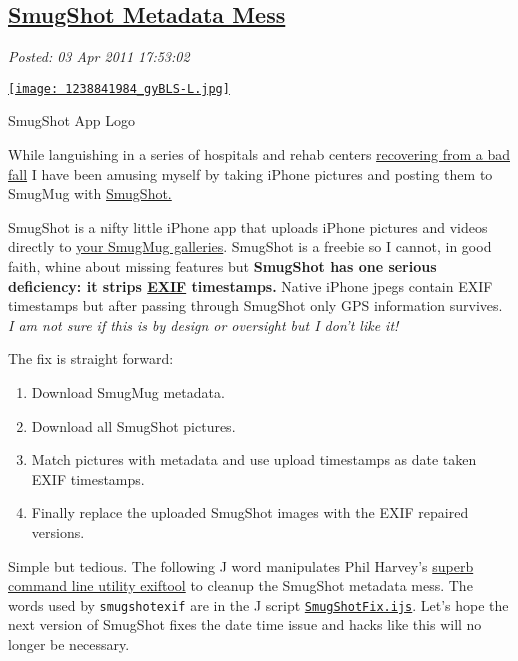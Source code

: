 %

\subsection*{\href{https://bakerjd99.wordpress.com/2011/04/03/smugshot-metadata-mess/}{SmugShot Metadata Mess}}


\noindent\emph{Posted: 03 Apr 2011 17:53:02}
\vspace{6pt}


\captionsetup[floatingfigure]{labelformat=empty}
\begin{floatingfigure}[r]{0.26\textwidth}
\centering
\href{http://itunes.apple.com/us/app/smugshot/id284129416?mt=8}{\texttt{[image: 1238841984\_gyBLS-L.jpg]}}
\caption{SmugShot App Logo}
\label{fig:1258X0}
\end{floatingfigure}While languishing in a series of hospitals and rehab centers
\href{http://bakerjd99.wordpress.com/2011/02/25/a-walk-in-the-park/}{recovering
from a bad fall} I have been amusing myself by taking iPhone pictures
and posting them to SmugMug with
\href{http://itunes.apple.com/us/app/smugshot/id284129416?mt=8}{SmugShot.}

SmugShot is a nifty little iPhone app that uploads iPhone pictures and
videos directly to
\href{http://conceptcontrol.smugmug.com/Themes/Diaries/SmugShots/16038397\_4tPwa}{your
SmugMug galleries}. SmugShot is a freebie so I cannot, in good faith,
whine about missing features but \textbf{SmugShot has one serious
deficiency: it strips
\href{http://graphicssoft.about.com/od/glossary/g/exif.htm}{EXIF}
timestamps.} Native iPhone jpegs contain EXIF timestamps but after
passing through SmugShot only GPS information survives. \emph{I am not
sure if this is by design or oversight but I don't like it!}

The fix is straight forward:

\begin{enumerate}
\tightlist
\item
  Download SmugMug metadata.
\item
  Download all SmugShot pictures.
\item
  Match pictures with metadata and use upload timestamps as date taken
  EXIF timestamps.
\item
  Finally replace the uploaded SmugShot images with the EXIF repaired
  versions.
\end{enumerate}
Simple but tedious. The following J word manipulates Phil Harvey's
\href{http://www.sno.phy.queensu.ca/~phil/exiftool/}{superb command line
utility exiftool} to cleanup the SmugShot metadata mess. The words used
by \texttt{smugshotexif} are in the J script
\href{https://github.com/bakerjd99/jacks/blob/master/smugmug/SmugShotFix.ijs}{\texttt{SmugShotFix.ijs}}. 
Let's hope the next version of SmugShot fixes the
date time issue and hacks like this will no longer be necessary.


